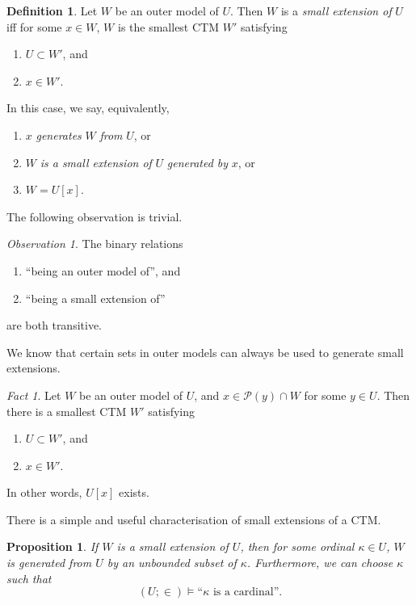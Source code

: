 \documentclass[12pt, twoside]{memoir}
\numberwithin{equation}{section}
\newtheorem{prop}[thm]{Proposition}
\theoremstyle{definition}
\newtheorem{defi}[thm]{Definition}
\theoremstyle{remark}
\newtheorem{ob}[thm]{Observation}
\newtheorem{fact}[thm]{Fact}
\theoremstyle{definition}
\theoremstyle{definition}
\theoremstyle{definition}
\theoremstyle{remark}
\begin{document}
\begin{defi}
Let $W$ be an outer model of $U$. Then $W$ is a \emph{small extension of} $U$ iff for some $x \in W$, $W$ is the smallest CTM $W'$ satisfying
\begin{enumerate}[label=(\alph*)]
    \item $U \subset W'$, and
    \item $x \in W'$.
\end{enumerate}
In this case, we say, equivalently,
\begin{enumerate}[label=(\arabic*)]
    \item $x$ \emph{generates} $W$ \emph{from} $U$, or
    \item $W$ \emph{is a small extension of} $U$ \emph{generated by} $x$, or
    \item $W = U[x]$.
\end{enumerate}
\end{defi}

The following observation is trivial.

\begin{ob}
The binary relations 
\begin{enumerate}[label=(\arabic*)]
    \item ``being an outer model of'', and
    \item ``being a small extension of''
\end{enumerate}
are both transitive.
\end{ob}

We know that certain sets in outer models can always be used to generate small extensions.

\begin{fact}\label{fact34}
Let $W$ be an outer model of $U$, and $x \in \mathcal{P}(y) \cap W$ for some $y \in U$. Then there is a smallest CTM $W'$ satisfying
\begin{enumerate}[label=(\alph*)]
    \item $U \subset W'$, and
    \item $x \in W'$.
\end{enumerate}
In other words, $U[x]$ exists.
\end{fact}

There is a simple and useful characterisation of small extensions of a CTM.

\begin{prop}\label{prop35}
If $W$ is a small extension of $U$, then for some ordinal $\kappa \in U$, $W$ is generated from $U$ by an unbounded subset of $\kappa$. Furthermore, we can choose $\kappa$ such that
\begin{equation*}
    (U; \in) \models \text{``} \kappa \text{ is a cardinal''.}
\end{equation*}
\end{prop}
\end{document}
